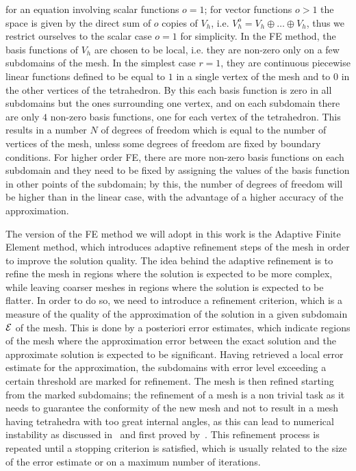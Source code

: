 for an equation involving scalar functions $o=1$; for vector functions $o>1$ the space is given by the direct sum of $o$ copies of $V_h$, i.e. $V_h^o = V_h \oplus \dots \oplus V_h$, thus we restrict ourselves to the scalar case $o=1$ for simplicity. \newline
In the FE method, the basis functions of $V_h$ are chosen to be local, i.e. they are non-zero only on a few subdomains of the mesh.
In the simplest case $r=1$, they are continuous piecewise linear functions defined to be equal to $1$ in a single vertex of the mesh and to $0$ in the other vertices of the tetrahedron. 
By this each basis function is zero in all subdomains but the ones surrounding one vertex, and on each subdomain there are only $4$ non-zero basis functions, one for each vertex of the tetrahedron.
This results in a number $N$ of degrees of freedom which is equal to the number of vertices of the mesh, unless some degrees of freedom are fixed by boundary conditions.
For higher order FE, there are more non-zero basis functions on each subdomain and they need to be fixed by assigning the values of the basis function in other points of the subdomain; by this, the number of degrees of freedom will be higher than in the linear case, with the advantage of a higher accuracy of the approximation. \medskip

The version of the FE method we will adopt in this work is the Adaptive Finite Element method, which introduces adaptive refinement steps of the mesh in order to improve the solution quality.
The idea behind the adaptive refinement is to refine the mesh in regions where the solution is expected to be more complex, while leaving coarser meshes in regions where the solution is expected to be flatter.
In order to do so, we need to introduce a refinement criterion, which is a measure of the quality of the approximation of the solution in a given subdomain $\mathcal E$ of the mesh.
This is done by a posteriori error estimates, which indicate regions of the mesh where the approximation error between the exact solution and the approximate solution is expected to be significant.
Having retrieved a local error estimate for the approximation, the subdomains with error level exceeding a certain threshold are marked for refinement.
The mesh is then refined starting from the marked subdomains; the refinement of a mesh is a non trivial task as it needs to guarantee the conformity of the new mesh and not to result in a mesh having tetrahedra with too great internal angles, as this can lead to numerical instability as discussed in~\cite[Section 4.4.3]{DeuflhardWeiser2012} and first proved by~\cite{SyngeRheinboldt1957}.
This refinement process is repeated until a stopping criterion is satisfied, which is usually related to the size of the error estimate or on a maximum number of iterations.\medskip

